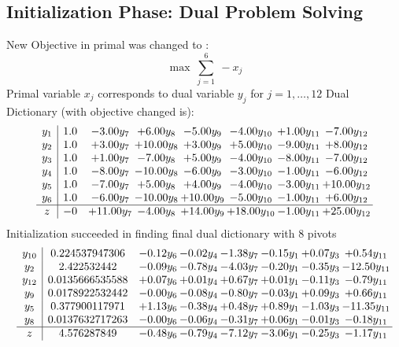 \documentclass[8pt]{article}
\begin{document}
\subsection{Initialization Phase: Dual Problem Solving}
New Objective in primal was changed to : \[ \max\ \sum_{j=1}^{6}\ - x_j \] 
Primal variable $x_j$ corresponds to dual variable $y_j$ for $j = 1,\ldots,12$
Dual Dictionary (with objective changed is): 
\[\begin{array}{c| c c@{\hskip 2pt} c@{\hskip 2pt} c@{\hskip 2pt} c@{\hskip 2pt} c@{\hskip 2pt} c@{\hskip 2pt} }
 y_{1}   &  1.0 & -3.00 y_{7} & +  6.00 y_{8} & -5.00 y_{9} & -4.00 y_{10} & +  1.00 y_{11} & -7.00 y_{12}\\
 y_{2}   &  1.0 & +  3.00 y_{7} & + 10.00 y_{8} & +  3.00 y_{9} & +  5.00 y_{10} & -9.00 y_{11} & +  8.00 y_{12}\\
 y_{3}   &  1.0 & +  1.00 y_{7} & -7.00 y_{8} & +  5.00 y_{9} & -4.00 y_{10} & -8.00 y_{11} & -7.00 y_{12}\\
 y_{4}   &  1.0 & -8.00 y_{7} & -10.00 y_{8} & -6.00 y_{9} & -3.00 y_{10} & -1.00 y_{11} & -6.00 y_{12}\\
 y_{5}   &  1.0 & -7.00 y_{7} & +  5.00 y_{8} & +  4.00 y_{9} & -4.00 y_{10} & -3.00 y_{11} & + 10.00 y_{12}\\
 y_{6}   &  1.0 & -6.00 y_{7} & -10.00 y_{8} & + 10.00 y_{9} & -5.00 y_{10} & -1.00 y_{11} & +  6.00 y_{12}\\
\hline
z    &  -0 & + 11.00 y_{7} & -4.00 y_{8} & + 14.00 y_{9} & + 18.00 y_{10} & -1.00 y_{11} & + 25.00 y_{12}\\
\end{array}\]
Initialization succeeded in finding final dual dictionary with 8 pivots
\[\begin{array}{c| c c@{\hskip 2pt} c@{\hskip 2pt} c@{\hskip 2pt} c@{\hskip 2pt} c@{\hskip 2pt} c@{\hskip 2pt} }
 y_{10}   &  0.224537947306 & -0.12 y_{6} & -0.02 y_{4} & -1.38 y_{7} & -0.15 y_{1} & +  0.07 y_{3} & +  0.54 y_{11}\\
 y_{2}   &  2.422532442 & -0.09 y_{6} & -0.78 y_{4} & -4.03 y_{7} & -0.20 y_{1} & -0.35 y_{3} & -12.50 y_{11}\\
 y_{12}   &  0.0135666535588 & +  0.07 y_{6} & +  0.01 y_{4} & +  0.67 y_{7} & +  0.01 y_{1} & -0.11 y_{3} & -0.79 y_{11}\\
 y_{9}   &  0.0178922532442 & -0.00 y_{6} & -0.08 y_{4} & -0.80 y_{7} & -0.03 y_{1} & +  0.09 y_{3} & +  0.66 y_{11}\\
 y_{5}   &  0.377900117971 & +  1.13 y_{6} & -0.38 y_{4} & +  0.48 y_{7} & +  0.89 y_{1} & -1.03 y_{3} & -11.35 y_{11}\\
 y_{8}   &  0.0137632717263 & -0.00 y_{6} & -0.06 y_{4} & -0.31 y_{7} & +  0.06 y_{1} & -0.01 y_{3} & -0.18 y_{11}\\
\hline
z    &  4.576287849 & -0.48 y_{6} & -0.79 y_{4} & -7.12 y_{7} & -3.06 y_{1} & -0.25 y_{3} & -1.17 y_{11}\\
\end{array}\]
\end{document}
